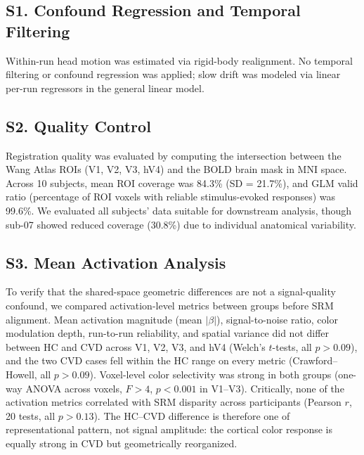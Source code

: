 \renewcommand{\thetable}{S\arabic{table}}\setcounter{table}{0}


\subsection*{\textbf{S1. Confound Regression and Temporal Filtering}}

Within-run head motion was estimated via rigid-body realignment.
No temporal filtering or confound regression was applied; slow drift was modeled via linear per-run regressors in the general linear model.



\subsection*{\textbf{S2. Quality Control}}

Registration quality was evaluated by computing the intersection between the Wang Atlas ROIs (V1, V2, V3, hV4) and the BOLD brain mask in MNI space.
Across 10 subjects, mean ROI coverage was 84.3\% (SD = 21.7\%), and GLM valid ratio (percentage of ROI voxels with reliable stimulus-evoked responses) was 99.6\%.
We evaluated all subjects' data suitable for downstream analysis, though sub-07 showed reduced coverage (30.8\%) due to individual anatomical variability.






\subsection*{\textbf{S3. Mean Activation Analysis}}

To verify that the shared-space geometric differences are not a signal-quality confound, we compared activation-level metrics between groups before SRM alignment. Mean activation magnitude (mean $|\beta|$), signal-to-noise ratio, color modulation depth, run-to-run reliability, and spatial variance did not differ between HC and CVD across V1, V2, V3, and hV4 (Welch's $t$-tests, all $p > 0.09$), and the two CVD cases fell within the HC range on every metric (Crawford--Howell, all $p > 0.09$). Voxel-level color selectivity was strong in both groups (one-way ANOVA across voxels, $F > 4$, $p < 0.001$ in V1--V3). Critically, none of the activation metrics correlated with SRM disparity across participants (Pearson $r$, 20 tests, all $p > 0.13$). The HC--CVD difference is therefore one of representational pattern, not signal amplitude: the cortical color response is equally strong in CVD but geometrically reorganized.


